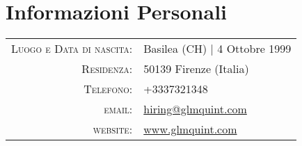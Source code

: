 \documentclass[a4paper,10pt]{article} %
\begin{document}
\pagestyle{fancy} %
\fancyhead{}
\renewcommand{\headrulewidth}{0pt}
\cfoot{}


\par{\bigskip\par} %

\section{Informazioni Personali}

\begin{tabular}{rl}
\textsc{Luogo e Data di nascita:} & Basilea (CH) | 4 Ottobre 1999\\
\textsc{Residenza:} & 50139 Firenze (Italia) \\
\textsc{Telefono:} & +3337321348\\
\textsc{email:} & \href{mailto:hiring@glmquint.com}{hiring@glmquint.com}\\
\textsc{website:} & \href{www.glmquint.com}{www.glmquint.com}
\end{tabular}

\end{document}
